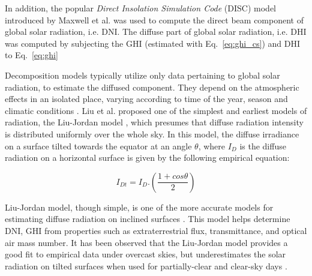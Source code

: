 \par In addition, the popular \textit{Direct Insolation Simulation Code} (DISC) model introduced by Maxwell et al. \cite{pvlib_disc} was used to compute the direct beam component of global solar radiation, i.e. DNI. The diffuse part of global solar radiation, i.e. DHI was computed by subjecting the GHI (estimated with Eq.~\ref{eq:ghi_cs}) and DHI to Eq.~\ref{eq:ghi}


\par Decomposition models typically utilize only data pertaining to global solar radiation, to estimate the diffused component. They depend on the atmospheric effects in an isolated place, varying according to time of the year, season and climatic conditions \cite{pvlib_liujordan}. Liu et al. proposed one of the simplest and earliest models of radiation, the Liu-Jordan model \cite{pvlib_liujordan2}, which presumes that diffuse radiation intensity is distributed uniformly over the whole sky. In this model, the diffuse irradiance on a surface tilted towards the equator at an angle $\theta$, where $I_D$ is the diffuse radiation on a horizontal surface is given by the following empirical equation:

\begin{equation}\label{eq:lj_dhi}
    I_{Dt} = I_D . (\frac{1 + cos\theta}{2})
\end{equation}

Liu-Jordan model, though simple, is one of the more accurate models for estimating diffuse radiation on inclined surfaces \cite{pvlib_liujordan3}. This model helps determine DNI, GHI from properties such as extraterrestrial flux, transmittance, and optical air mass number. It has been observed that the Liu-Jordan model provides a good fit to empirical data under overcast skies, but underestimates the solar radiation on tilted surfaces when used for partially-clear and clear-sky days \cite{pvlib_liujordan4}.

